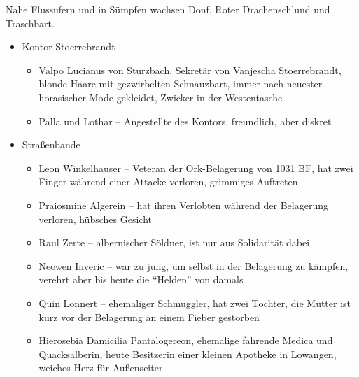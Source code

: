 Nahe Flussufern und in Sümpfen wachsen Donf, Roter Drachenschlund und Traschbart.






\begin{itemize}
    \item Kontor Stoerrebrandt
        \begin{itemize}
        	\item  Valpo Lucianus von Sturzbach, Sekretär von Vanjescha Stoerrebrandt, blonde Haare mit gezwirbelten Schnauzbart, immer nach neuester horasischer Mode gekleidet, Zwicker in der Westentasche
        \item Palla und Lothar -- Angestellte des Kontors, freundlich, aber diskret
                \end{itemize}
    \item Straßenbande
                \begin{itemize}
        	\item  Leon Winkelhauser -- Veteran der Ork-Belagerung von 1031 BF, hat zwei Finger während einer Attacke verloren, grimmiges Auftreten
        \item Praiosmine Algerein -- hat ihren Verlobten während der Belagerung verloren, hübsches Gesicht
        \item Raul Zerte -- albernischer Söldner, ist nur aus Solidarität dabei
        \item Neowen Inveric -- war zu jung, um selbst in der Belagerung zu kämpfen, verehrt aber bis heute die \enquote{Helden} von damals
    \item Quin Lonnert -- ehemaliger Schmuggler, hat zwei Töchter, die Mutter ist kurz vor der Belagerung an einem Fieber gestorben
    \item Hierosebia Damicilia Pantalogereon, ehemalige fahrende Medica und Quacksalberin, heute Besitzerin einer kleinen Apotheke in Lowangen, weiches Herz für Außenseiter

\end{itemize}
\end{itemize}
